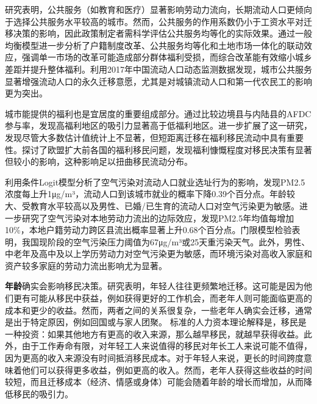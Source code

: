 \documentclass[a4paper, zihao=-4, fontset = mac, oneside]{ctexbook} %
\begin{document}
\textcite{XiaYiRanChengShiJianDeMengMuSanQianGongGongFuWuYingXiangLaoDongLiLiuXiangDeJingYanYanJiu2015}研究表明，公共服务（如教育和医疗）显著影响劳动力流向，长期流动人口更倾向于选择公共服务水平较高的城市。然而，公共服务的作用系数仍小于工资水平对迁移决策的影响，因此政策制定者需科学评估公共服务均等化的实际效果。\textcite{GuoDongMeiChengXiangRongHeDeShouRuHeFuLiXiaoYingYanJiuJiYuYaoSuPeiZhiDeShiJiao2023}通过一般均衡模型进一步分析了户籍制度改革、公共服务均等化和土地市场一体化的联动效应，强调单一市场的改革可能造成部分群体福利受损，而综合改革能有效缩小城乡差距并提升整体福利。\textcite{LiuJinFengChengShiGongGongFuWuDuiLiuDongRenKouYongJiuQianYiYiYuanDeYingXiang2019}利用2017年中国流动人口动态监测数据发现，城市公共服务显著增强流动人口的永久迁移意愿，尤其是对城镇流动人口和第一代农民工的影响更为突出。

城市能提供的福利也是宜居度的重要组成部分。\textcite{benjaminImportingPoorWelfare2004}通过比较边境县与内陆县的AFDC参与率，发现高福利地区的吸引力显著高于低福利地区。\textcite{mckinnishWelfareinducedMigrationState2007}进一步扩展了这一研究，发现尽管大多数估计值统计上不显著，但短距离迁移在福利移民流动中具有重要性。\textcite{degiorgiWelfareMigrationEurope2009}探讨了欧盟扩大前各国的福利移民问题，发现福利慷慨程度对移民决策有显著但较小的影响，这种影响足以扭曲移民流动分布。

\textcite{SunWeiZengKongQiWuRanYuLaoDongLiDeKongJianLiuDongJiYuLiuDongRenKouJiuYeXuanZhiXingWeiDeYanJiu2019}利用条件Logit模型分析了空气污染对流动人口就业选址行为的影响，发现PM2.5浓度每上升1μg/m³，流动人口到该城市就业的概率下降0.39个百分点。年龄较大、受教育水平较高以及男性、已婚/已生育的流动人口对空气污染更为敏感。\textcite{ZhangYanKongQiWuRanDuiBenDiLaoDongLiLiuChuDeYingXiangYanJiu2023}进一步研究了空气污染对本地劳动力流出的边际效应，发现PM2.5年均值每增加10\%，本地户籍劳动力跨区县流出概率显著上升0.68个百分点。门限模型检验表明，我国现阶段的空气污染压力阈值为67μg/m³或25天重污染天气。此外，男性、中老年及高中及以上学历劳动力对空气污染更为敏感，而环境污染对高收入家庭和资产较多家庭的劳动力流出影响尤为显著。





\textbf{年龄}确实会影响移民决策。研究表明，年轻人往往更频繁地迁移。这可能是因为他们更有可能从移民中获益，例如获得更好的工作机会，而老年人则可能面临更高的成本和更少的收益。然而，两者之间的关系很复杂，一些老年人确实会迁移，通常是出于特定原因，例如回国或与家人团聚。
标准的人力资本理论解释是，移民是一种投资：如果其他地方有更高的收入来源，那么越早移民，就越早获得收益。此外，由于工作寿命有限，对年轻工人来说值得的移民对年长工人来说可能不值得，因为更高的收入来源没有时间抵消移民成本。对于年轻人来说，更长的时间跨度意味着他们可以获得更多收益，例如更高的收入。然而，老年人获得这些收益的时间较短，而且迁移成本（经济、情感或身体）可能会随着年龄的增长而增加，从而降低移民的吸引力。
\end{document}

